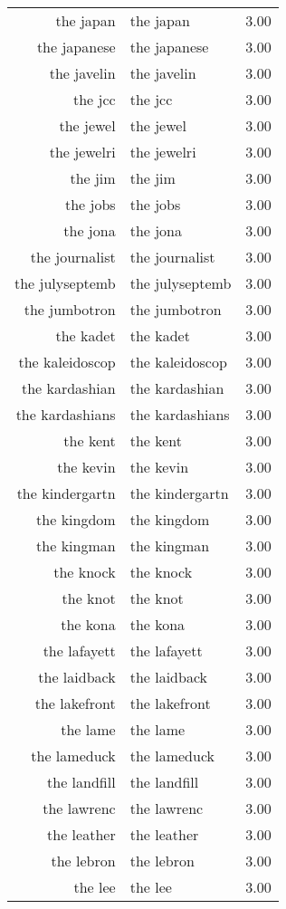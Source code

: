 \begin{table}[ht]
\begin{tabular}{rlr}
  the japan & the japan & 3.00 \\ 
  the japanese & the japanese & 3.00 \\ 
  the javelin & the javelin & 3.00 \\ 
  the jcc & the jcc & 3.00 \\ 
  the jewel & the jewel & 3.00 \\ 
  the jewelri & the jewelri & 3.00 \\ 
  the jim & the jim & 3.00 \\ 
  the jobs & the jobs & 3.00 \\ 
  the jona & the jona & 3.00 \\ 
  the journalist & the journalist & 3.00 \\ 
  the julyseptemb & the julyseptemb & 3.00 \\ 
  the jumbotron & the jumbotron & 3.00 \\ 
  the kadet & the kadet & 3.00 \\ 
  the kaleidoscop & the kaleidoscop & 3.00 \\ 
  the kardashian & the kardashian & 3.00 \\ 
  the kardashians & the kardashians & 3.00 \\ 
  the kent & the kent & 3.00 \\ 
  the kevin & the kevin & 3.00 \\ 
  the kindergartn & the kindergartn & 3.00 \\ 
  the kingdom & the kingdom & 3.00 \\ 
  the kingman & the kingman & 3.00 \\ 
  the knock & the knock & 3.00 \\ 
  the knot & the knot & 3.00 \\ 
  the kona & the kona & 3.00 \\ 
  the lafayett & the lafayett & 3.00 \\ 
  the laidback & the laidback & 3.00 \\ 
  the lakefront & the lakefront & 3.00 \\ 
  the lame & the lame & 3.00 \\ 
  the lameduck & the lameduck & 3.00 \\ 
  the landfill & the landfill & 3.00 \\ 
  the lawrenc & the lawrenc & 3.00 \\ 
  the leather & the leather & 3.00 \\ 
  the lebron & the lebron & 3.00 \\ 
  the lee & the lee & 3.00 \\ 

\end{tabular}
\end{table}
